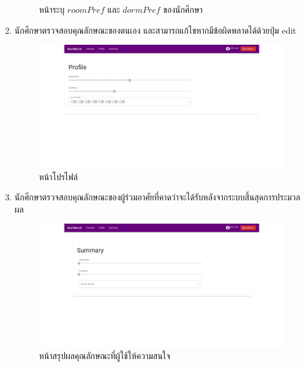 \begin{enumerate}
\begin{figure}[ht]
\begin{center}
          \end{center}
          \caption{หน้าระบุ $\mathit{roomPref}$ และ $\mathit{dormPref}$ ของนักศึกษา}
          \label{fig:room-pref}
        \end{figure}
        \clearpage
  \item นักศึกษาตรวจสอบคุณลักษณะของตนเอง และสามารถแก้ไขหากมีข้อผิดพลาดได้ด้วยปุ่ม edit
        \begin{figure}[ht]
          \begin{center}
            \includegraphics[width=\linewidth]{photo/web/student/profile.jpeg}
          \end{center}
          \caption{หน้าโปรไฟล์}
          \label{fig:profile}
        \end{figure}
        \clearpage
  \item นักศึกษาตรวจสอบคุณลักษณะของผู้ร่วมอาศัยที่คาดว่าจะได้รับหลังจากระบบสิ้นสุดการประมวลผล
        \begin{figure}[ht]
          \begin{center}
            \includegraphics[width=\linewidth]{photo/web/student/summary.jpeg}
          \end{center}
          \caption{หน้าสรุปผลคุณลักษณะที่ผู้ใช้ให้ความสนใจ}
          \label{fig:summary}
        \end{figure}

\end{enumerate}
